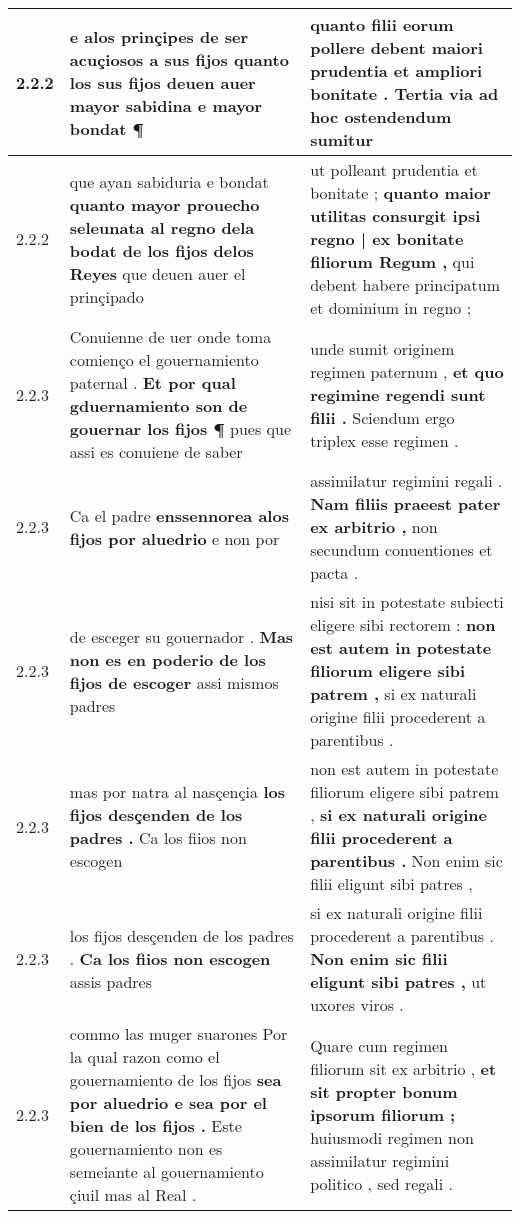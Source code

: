 \begin{tabular}{|p{1cm}|p{6.5cm}|p{6.5cm}|}
2.2.2 & e alos prinçipes de ser acuçiosos a sus fijos \textbf{ quanto los sus fijos deuen auer mayor sabidina } e mayor bondat ¶ & quanto filii eorum pollere debent \textbf{ maiori prudentia et ampliori bonitate . } Tertia via ad hoc ostendendum sumitur \\\hline
2.2.2 & que ayan sabiduria e bondat \textbf{ quanto mayor prouecho seleunata al regno dela bodat de los fijos delos Reyes } que deuen auer el prinçipado & ut polleant prudentia et bonitate ; \textbf{ quanto maior utilitas consurgit ipsi regno | ex bonitate filiorum Regum , } qui debent habere principatum et dominium in regno ; \\\hline
2.2.3 & Conuienne de uer onde toma comienço el gouernamiento paternal . \textbf{ Et por qual gduernamiento son de gouernar los fijos ¶ } pues que assi es conuiene de saber & unde sumit originem regimen paternum , \textbf{ et quo regimine regendi sunt filii . } Sciendum ergo triplex esse regimen . \\\hline
2.2.3 & Ca el padre \textbf{ enssennorea alos fijos por aluedrio } e non por & assimilatur regimini regali . \textbf{ Nam filiis praeest pater ex arbitrio , } non secundum conuentiones et pacta . \\\hline
2.2.3 & de esceger su gouernador . \textbf{ Mas non es en poderio de los fijos de escoger } assi mismos padres & nisi sit in potestate subiecti eligere sibi rectorem : \textbf{ non est autem in potestate filiorum eligere sibi patrem , } si ex naturali origine filii procederent a parentibus . \\\hline
2.2.3 & mas por natra al nasçençia \textbf{ los fijos desçenden de los padres . } Ca los fiios non escogen & non est autem in potestate filiorum eligere sibi patrem , \textbf{ si ex naturali origine filii procederent a parentibus . } Non enim sic filii eligunt sibi patres , \\\hline
2.2.3 & los fijos desçenden de los padres . \textbf{ Ca los fiios non escogen } assis padres & si ex naturali origine filii procederent a parentibus . \textbf{ Non enim sic filii eligunt sibi patres , } ut uxores viros . \\\hline
2.2.3 & commo las muger suarones Por la qual razon como el gouernamiento de los fijos \textbf{ sea por aluedrio e sea por el bien de los fijos . } Este gouernamiento non es semeiante al gouernamiento çiuil mas al Real . & Quare cum regimen filiorum sit ex arbitrio , \textbf{ et sit propter bonum ipsorum filiorum ; } huiusmodi regimen non assimilatur regimini politico , sed regali . \\\hline

\end{tabular}
